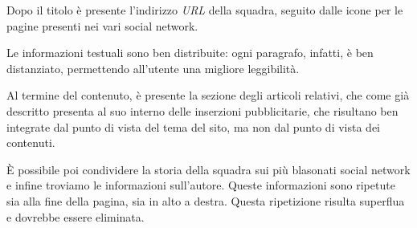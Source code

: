 Dopo il titolo è presente l'indirizzo \textit{URL} della squadra, seguito dalle
icone per le pagine presenti nei vari social network.

Le informazioni testuali sono ben distribuite: ogni paragrafo, infatti, è
ben distanziato, permettendo all'utente una migliore leggibilità.

Al termine del contenuto, è presente la sezione degli articoli relativi, che
come già descritto presenta al suo interno delle inserzioni pubblicitarie, che
risultano ben integrate dal punto di vista del tema del sito, ma non dal punto
di vista dei contenuti.

È possibile poi condividere la storia della squadra sui più blasonati social
network e infine troviamo le informazioni sull'autore. Queste informazioni
sono ripetute sia alla fine della pagina, sia in alto a destra. Questa
ripetizione risulta superflua e dovrebbe essere eliminata.
